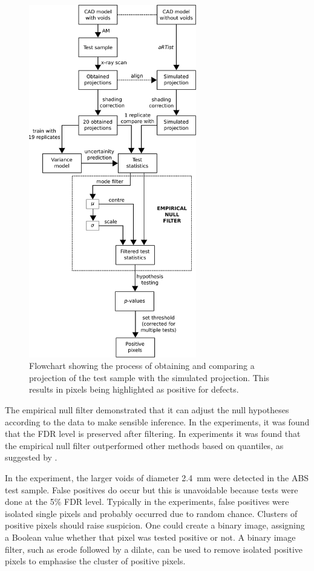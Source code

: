 \begin{figure}
  \centering
  \includegraphics[width=0.65\textwidth]{../figures/flowchart.pdf}
  \caption{Flowchart showing the process of obtaining and comparing a projection of the test sample with the simulated projection. This results in pixels being highlighted as positive for defects.}
  \label{fig:inference_flowchart}
\end{figure}

The empirical null filter demonstrated that it can adjust the null hypotheses according to the data to make sensible inference. In the experiments, it was found that the FDR level is preserved after filtering. In experiments it was found that the empirical null filter outperformed other methods based on quantiles, as suggested by \cite{efron2004large}.

In the experiment, the larger voids of diameter \SI{2.4}{\milli\metre} were detected in the ABS test sample. False positives do occur but this is unavoidable because tests were done at the 5\% FDR level. Typically in the experiments, false positives were isolated single pixels and probably occurred due to random chance. Clusters of positive pixels should raise suspicion. One could create a binary image, assigning a Boolean value whether that pixel was tested positive or not. A binary image filter, such as erode followed by a dilate, can be used to remove isolated positive pixels to emphasise the cluster of positive pixels.


